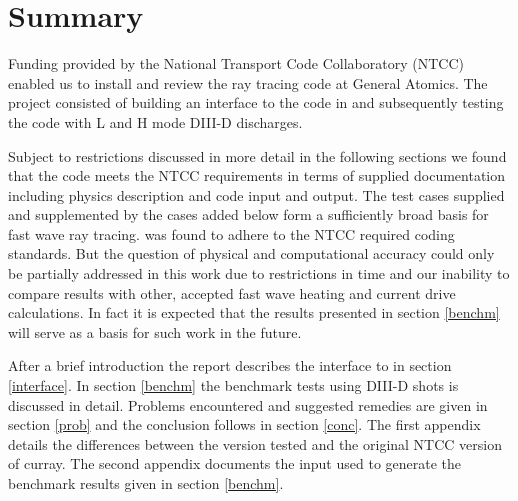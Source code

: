 

\renewcommand{\textfraction}{0.10}
\renewcommand{\topfraction}{0.90}  %
\renewcommand{\bottomfraction}{0.65} %
\renewcommand{\floatpagefraction}{0.60}

\section*{Summary}
 Funding provided by the National Transport Code Collaboratory 
(NTCC) enabled us to install and review the ray tracing code \ct
at General Atomics. The project consisted of building an interface to
the \ct code in \ot and subsequently testing the \ct code with L and H
mode DIII-D discharges. 

 Subject to restrictions discussed in more detail in the following
 sections we found that the \ct code meets the NTCC requirements in
 terms of supplied documentation including physics description and
 code input and output. The test cases supplied and supplemented by the
 cases added  below  form a sufficiently broad basis for fast wave ray
 tracing. \ct was found to adhere to  the NTCC 
 required coding standards. But the question of physical and computational
 accuracy could only be partially addressed in this work due to
 restrictions in time and our inability to compare \ct results with
 other, accepted fast wave heating and current drive calculations.
 In fact it is expected that the results presented in section
 \ref{benchm} will serve as a basis for such work in the future.  

 After a brief introduction the report
describes the interface to \ot in section \ref{interface}. In section \ref{benchm} the
benchmark tests using DIII-D shots is discussed in detail. Problems
encountered and suggested remedies are given in section \ref{prob} and the
conclusion follows in section \ref{conc}. The first  appendix  details  the
differences between the  version tested and the original  NTCC
version of curray. The second appendix documents the input used to
generate the benchmark results given in section \ref{benchm}.


 
